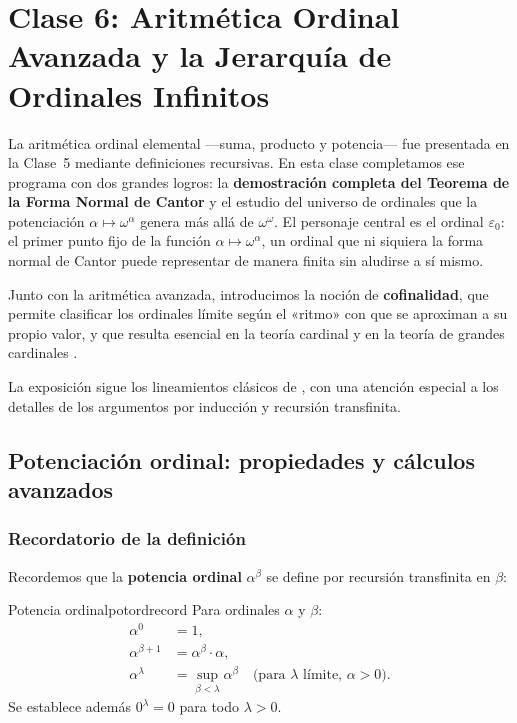 \chapter{Clase 6: Aritmética Ordinal Avanzada y la Jerarquía de Ordinales Infinitos}

La aritmética ordinal elemental —suma, producto y potencia— fue presentada en la Clase~5 mediante definiciones recursivas. En esta clase completamos ese programa con dos grandes logros: la \textbf{demostración completa del Teorema de la Forma Normal de Cantor} y el estudio del universo de ordinales que la potenciación $\alpha \mapsto \omega^\alpha$ genera más allá de $\omega^\omega$. El personaje central es el ordinal $\varepsilon_0$: el primer punto fijo de la función $\alpha \mapsto \omega^\alpha$, un ordinal que ni siquiera la forma normal de Cantor puede representar de manera finita sin aludirse a sí mismo.

Junto con la aritmética avanzada, introducimos la noción de \textbf{cofinalidad}, que permite clasificar los ordinales límite según el «ritmo» con que se aproximan a su propio valor, y que resulta esencial en la teoría cardinal y en la teoría de grandes cardinales \cite{jech2003, kanamori2003}.

La exposición sigue los lineamientos clásicos de \cite{sierpinski1958, enderton1977, hrbacek1999, levy1979}, con una atención especial a los detalles de los argumentos por inducción y recursión transfinita.

\section{Potenciación ordinal: propiedades y cálculos avanzados}

\subsection{Recordatorio de la definición}

Recordemos que la \textbf{potencia ordinal} $\alpha^\beta$ se define por recursión transfinita en $\beta$:

\begin{definicion}{Potencia ordinal}{potordrecord}
Para ordinales $\alpha$ y $\beta$:
\begin{align*}
  \alpha^0 &= 1, \\
  \alpha^{\beta+1} &= \alpha^\beta \cdot \alpha, \\
  \alpha^\lambda &= \sup_{\beta < \lambda} \alpha^\beta \quad \text{(para } \lambda \text{ límite, } \alpha > 0\text{)}.
\end{align*}
Se establece además $0^\lambda = 0$ para todo $\lambda > 0$.
\end{definicion}

